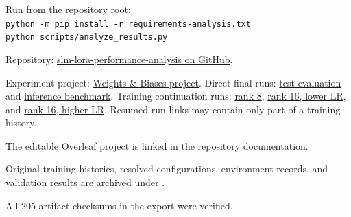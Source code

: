 \documentclass[10pt,a4paper,twocolumn]{article}
\begin{document}
Run from the repository root:\\
{\scriptsize\texttt{python -m pip install -r requirements-analysis.txt}}\\
\texttt{python scripts/analyze\_results.py}

Repository: \href{https://github.com/yashdave18/slm-lora-performance-analysis}{slm-lora-performance-analysis on GitHub}.

Experiment project: \href{https://wandb.ai/daveyash1218-dwarkadas-j-sanghvi-college-of-engineering/slm-lora-performance-analysis}{Weights \& Biases project}. Direct final runs: \href{https://wandb.ai/daveyash1218-dwarkadas-j-sanghvi-college-of-engineering/slm-lora-performance-analysis/runs/xtodi84b}{test evaluation} and \href{https://wandb.ai/daveyash1218-dwarkadas-j-sanghvi-college-of-engineering/slm-lora-performance-analysis/runs/b5fiqzmr}{inference benchmark}. Training continuation runs: \href{https://wandb.ai/daveyash1218-dwarkadas-j-sanghvi-college-of-engineering/slm-lora-performance-analysis/runs/e8dob4x9}{rank 8}, \href{https://wandb.ai/daveyash1218-dwarkadas-j-sanghvi-college-of-engineering/slm-lora-performance-analysis/runs/y4mz6akb}{rank 16, lower LR}, and \href{https://wandb.ai/daveyash1218-dwarkadas-j-sanghvi-college-of-engineering/slm-lora-performance-analysis/runs/ge2ub3kg}{rank 16, higher LR}. Resumed-run links may contain only part of a training history.

The editable Overleaf project is linked in the repository documentation.

Original training histories, resolved configurations, environment records, and validation results are archived under .

All 205 artifact checksums in the export were verified.



\end{document}
